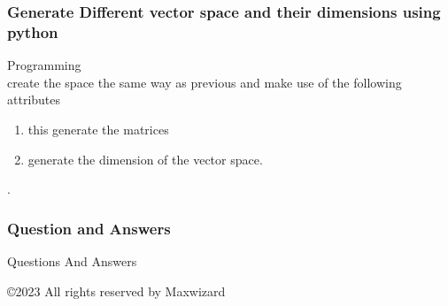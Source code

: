 \documentclass{beamer}
\begin{document}
\begin{frame}
\frametitle{Generate Different vector space and their dimensions using python}

\begin{block}{Programming} 
\\
create the space the same way as previous and make use of the following attributes
\begin{enumerate}
    \item {} this generate the matrices
    \item {} generate the dimension of the vector space.
\end{enumerate}.
\end{block}
\end{frame}

\begin{frame}
  \frametitle{Question and Answers}
  \begin{minipage}[t][.8\textheight]{\textwidth}
    \begin{center}
     \Huge{Questions And Answers}
     
    \end{center}
    
    \vfill
    \begin{center}
           \small \copyright 2023 All rights reserved by Maxwizard
    \end{center}

  \end{minipage}
\end{frame}
\end{document}
